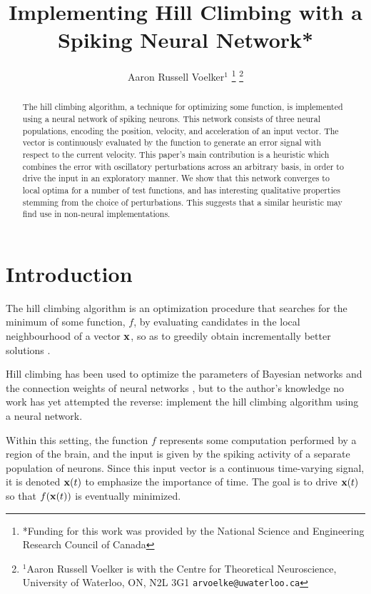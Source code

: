 \documentclass[letterpaper, 10 pt, conference]{ieeeconf}  %
\title{\LARGE \bf
Implementing Hill Climbing with a Spiking Neural Network*
}
\author{Aaron Russell Voelker$^{1}$%
\thanks{*Funding for this work was provided by the National Science and Engineering Research Council of Canada}%
\thanks{$^{1}$Aaron Russell Voelker is with the Centre for Theoretical Neuroscience, University of Waterloo, ON, N2L 3G1
        {\tt\small arvoelke@uwaterloo.ca}}%
}
\newcommand{\bolds}[1]{{\bf #1}}
\begin{document}
\maketitle
\thispagestyle{empty}
\pagestyle{empty}


\begin{abstract}

The hill climbing algorithm, a technique for optimizing some function, is implemented using a neural network of spiking neurons. This network consists of three neural populations, encoding the position, velocity, and acceleration of an input vector. The vector is continuously evaluated by the function to generate an error signal with respect to the current velocity. This paper's main contribution is a heuristic which combines the error with oscillatory perturbations across an arbitrary basis, in order to drive the input in an exploratory manner. We show that this network converges to local optima for a number of test functions, and has interesting qualitative properties stemming from the choice of perturbations. This suggests that a similar heuristic may find use in non-neural implementations.

\end{abstract}


\section{Introduction}

The hill climbing algorithm is an optimization procedure that searches for the minimum of some function, $f$, by evaluating candidates in the local neighbourhood of a vector $\bolds{x}$, so as to greedily obtain incrementally better solutions \cite{russell1995modern}.

Hill climbing has been used to optimize the parameters of Bayesian networks \cite{bayesianstructure} and the connection weights of neural networks \cite{chalup1999study}, but to the author's knowledge no work has yet attempted the reverse: implement the hill climbing algorithm using a neural network.

Within this setting, the function $f$ represents some computation performed by a region of the brain, and the input is given by the spiking activity of a separate population of neurons. Since this input vector is a continuous time-varying signal, it is denoted $\bolds{x}(t)$ to emphasize the importance of time. The goal is to drive $\bolds{x}(t)$ so that $f(\bolds{x}(t))$ is eventually minimized. 
\end{document}
